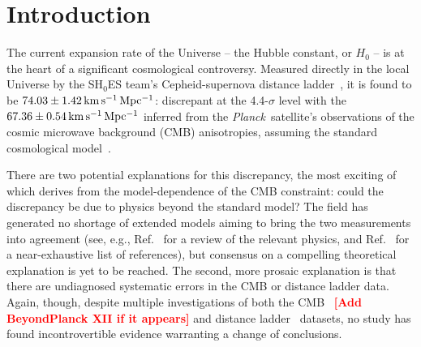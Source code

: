 \documentclass[%
 reprint,
 superscriptaddress,
 nofootinbib,
 amsmath,amssymb,
 aps,
]{revtex4-2}
\newcommand{\kmsmpc}{\ensuremath{{\rm km\,s^{-1}\,Mpc^{-1}}}}
\newcommand{\planck}{{\it Planck}}
\newcommand{\smf}[1]{\textcolor{red}{\bf [#1]}}
\begin{document}

\maketitle


\section{Introduction} \label{sec:intro}


The current expansion rate of the Universe -- the Hubble constant, or $H_0$ -- is at the heart of a significant cosmological controversy. Measured directly in the local Universe by the SH$_0$ES team's Cepheid-supernova distance ladder~\cite{Riess_etal:2019}, it is found to be $74.03 \pm 1.42 \,\kmsmpc$: discrepant at the 4.4-$\sigma$ level with the $67.36 \pm 0.54\,\kmsmpc$ inferred from the \planck\ satellite's observations of the cosmic microwave background (CMB) anisotropies, assuming the standard cosmological model~\cite{Planck_VI:2018}.

There are two potential explanations for this discrepancy, the most exciting of which derives from the model-dependence of the CMB constraint: could the discrepancy be due to physics beyond the standard model? The field has generated no shortage of extended models aiming to bring the two measurements into agreement (see, e.g., Ref.~\cite{Knox_Millea:2020} for a review of the relevant physics, and Ref.~\cite{Vagnozzi:2020} for a near-exhaustive list of references), but consensus on a compelling theoretical explanation is yet to be reached. The second, more prosaic explanation is that there are undiagnosed systematic errors in the CMB or distance ladder data. Again, though, despite multiple investigations of both the CMB~\cite{Spergel_etal:2015,Addison_etal:2016,Obied_etal:2017,Calabrese_etal:2017,Efstathiou_Gratton:2019,Motloch_Hu:2020,ACT:2020} \smf{Add BeyondPlanck XII if it appears} and distance ladder~\cite{Efstathiou:2014,Rigault_etal:2015,Jones_etal:2015,Cardona_etal:2016,Zhang_etal:2017,Follin_Knox:2017,Feeney_etal:2017,Wu_Huterer:2017,Dhawan_etal:2017,Bengaly_etal:2018,Rigault_etal:2018,Jones_etal:2018,Riess_etal:2020,Efstathiou:2020} datasets, no study has found incontrovertible evidence warranting a change of conclusions.
\end{document}
